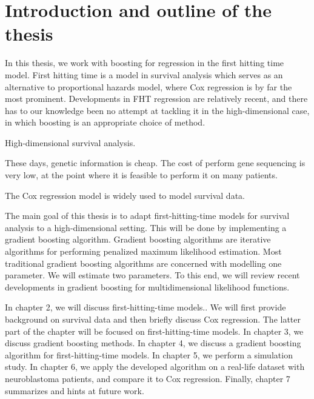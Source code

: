 \chapter{Introduction and outline of the thesis}
\label{sec:intro}

In this thesis, we work with boosting for regression in the first hitting time model.
First hitting time is a model in survival analysis which serves as an alternative to proportional hazards model, where Cox regression is by far the most prominent.
Developments in FHT regression are relatively recent, and there has to our knowledge been no attempt at tackling it in the high-dimensional case, in which boosting is an appropriate choice of method.

High-dimensional survival analysis.

These days, genetic information is cheap.
The cost of perform gene sequencing is very low, at the point where it is feasible to perform it on many patients.

The Cox regression model \citep{cox1965} is widely used to model survival data.


The main goal of this thesis is to adapt first-hitting-time models for survival analysis to a high-dimensional setting.
This will be done by implementing a gradient boosting algorithm.
Gradient boosting algorithms are iterative algorithms for performing penalized maximum likelihood estimation.
Most traditional gradient boosting algorithms are concerned with modelling one parameter.
We will estimate two parameters.
To this end, we will review recent developments in gradient boosting for multidimensional likelihood functions.

In chapter 2, we will discuss first-hitting-time models..
We will first provide background on survival data and then briefly discuss Cox regression.
The latter part of the chapter will be focused on first-hitting-time models.
In chapter 3, we discuss gradient boosting methods.
In chapter 4, we discuss a gradient boosting algorithm for first-hitting-time models.
In chapter 5, we perform a simulation study.
In chapter 6, we apply the developed algorithm on a real-life dataset with neuroblastoma patients, and compare it to Cox regression.
Finally, chapter 7 summarizes and hints at future work.